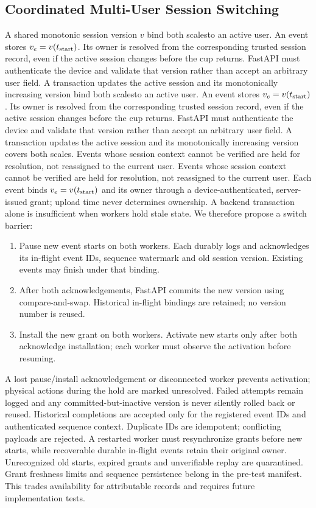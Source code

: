 \documentclass[conference]{IEEEtran}
\providecommand{\DIFadd}[1]{{\protect\color{blue} \sf #1}} %
\providecommand{\DIFdel}[1]{{\protect\color{red} \ifmmode #1\else\scriptsize #1\fi}} %
\providecommand{\DIFaddbegin}{} %
\providecommand{\DIFaddend}{} %
\providecommand{\DIFdelbegin}{} %
\providecommand{\DIFdelend}{} %
\begin{document}
\subsection{\DIFadd{Coordinated Multi-User Session Switching}}
\DIFadd{A shared monotonic }\DIFaddend session version $v$ \DIFdelbegin \DIFdel{bind both scalesto an active user. An event stores $v_e=v(t_{\rm start})$. Its owner is resolved from the corresponding trusted session record, even if the active session changes before the cup returns. FastAPI must authenticate the device and validate that version rather than accept an arbitrary user field.
A transaction updates the active session and its monotonically increasing version }\DIFdelend \DIFaddbegin \DIFadd{covers both scales}\DIFaddend . \DIFdelbegin \DIFdel{Events whose session context cannot be verified are held for resolution, not reassigned to the current user. }\DIFdelend \DIFaddbegin \DIFadd{Each event binds $v_e=v(t_{\rm start})$ and its owner through a device-authenticated, server-issued grant; upload time never determines ownership. A backend transaction alone is insufficient when workers hold stale state. We therefore propose a switch barrier:
}\begin{enumerate}
\item \DIFadd{Pause new event starts on both workers. Each durably logs and acknowledges its in-flight event IDs, sequence watermark and old session version. Existing events may finish under that binding.
}\item \DIFadd{After both acknowledgements, FastAPI commits the new version using compare-and-swap. Historical in-flight bindings are retained; no version number is reused.
}\item \DIFadd{Install the new grant on both workers. Activate new starts only after both acknowledge installation; each worker must observe the activation before resuming.
}\end{enumerate}
\DIFadd{A lost pause/install acknowledgement or disconnected worker prevents activation; physical actions during the hold are marked unresolved. Failed attempts remain logged and any committed-but-inactive version is never silently rolled back or reused. Historical completions are accepted only for the registered event IDs and authenticated sequence context. Duplicate IDs are idempotent; conflicting payloads are rejected. A restarted worker must resynchronize grants before new starts, while recoverable durable in-flight events retain their original owner. Unrecognized old starts, expired grants and unverifiable replay are quarantined. Grant freshness limits and sequence persistence belong in the pre-test manifest. This trades availability for attributable records and requires future implementation tests.
}\DIFaddend 
\end{document}
